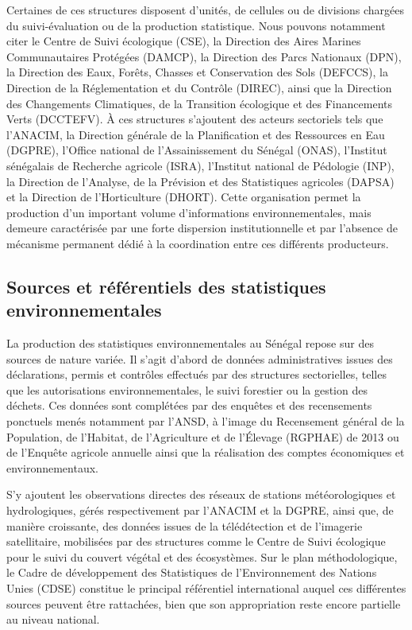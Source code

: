 \documentclass[12pt,a4paper]{report}
\begin{document}
Certaines de ces structures disposent d'unités, de cellules ou de divisions chargées du suivi-évaluation ou de la production statistique. Nous pouvons notamment citer le Centre de Suivi écologique (CSE), la Direction des Aires Marines Communautaires Protégées (DAMCP), la Direction des Parcs Nationaux (DPN), la Direction des Eaux, Forêts, Chasses et Conservation des Sols (DEFCCS), la Direction de la Réglementation et du Contrôle (DIREC), ainsi que la Direction des Changements Climatiques, de la Transition écologique et des Financements Verts (DCCTEFV). À ces structures s'ajoutent des acteurs sectoriels tels que l'ANACIM, la Direction générale de la Planification et des Ressources en Eau (DGPRE), l'Office national de l'Assainissement du Sénégal (ONAS), l'Institut sénégalais de Recherche agricole (ISRA), l'Institut national de Pédologie (INP), la Direction de l'Analyse, de la Prévision et des Statistiques agricoles (DAPSA) et la Direction de l'Horticulture (DHORT). Cette organisation permet la production d'un important volume d'informations environnementales, mais demeure caractérisée par une forte dispersion institutionnelle et par l'absence de mécanisme permanent dédié à la coordination entre ces différents producteurs.

\subsection{Sources et référentiels des statistiques environnementales}

La production des statistiques environnementales au Sénégal repose sur des sources de nature variée. Il s'agit d'abord de données administratives issues des déclarations, permis et contrôles effectués par des structures sectorielles, telles que les autorisations environnementales, le suivi forestier ou la gestion des déchets. Ces données sont complétées par des enquêtes et des recensements ponctuels menés notamment par l'ANSD, à l'image du Recensement général de la Population, de l'Habitat, de l'Agriculture et de l'Élevage (RGPHAE) de 2013 ou de l'Enquête agricole annuelle ainsi que la réalisation des comptes économiques et environnementaux.

S'y ajoutent les observations directes des réseaux de stations météorologiques et hydrologiques, gérés respectivement par l'ANACIM et la DGPRE, ainsi que, de manière croissante, des données issues de la télédétection et de l'imagerie satellitaire, mobilisées par des structures comme le Centre de Suivi écologique pour le suivi du couvert végétal et des écosystèmes. Sur le plan méthodologique, le Cadre de développement des Statistiques de l'Environnement des Nations Unies (CDSE) constitue le principal référentiel international auquel ces différentes sources peuvent être rattachées, bien que son appropriation reste encore partielle au niveau national.
\end{document}
